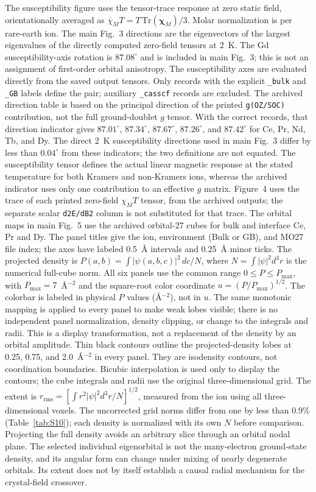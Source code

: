 \documentclass[11pt]{article}
\begin{document}
The susceptibility figure uses the tensor-trace response at zero static field, orientationally averaged as $\overline{\chi}_M T=T\,\mathrm{Tr}(\boldsymbol{\chi}_M)/3$. Molar normalization is per rare-earth ion. The main Fig.~3 directions are the eigenvectors of the largest eigenvalues of the directly computed zero-field tensors at 2~K. The Gd susceptibility-axis rotation is $87.08^\circ$ and is included in main Fig.~3; this is not an assignment of first-order orbital anisotropy. The susceptibility axes are evaluated directly from the saved output tensors. Only records with the explicit \texttt{\_bulk} and \texttt{\_GB} labels define the pair; auxiliary \texttt{\_casscf} records are excluded. The archived direction table is based on the principal direction of the printed \texttt{g(OZ/SOC)} contribution, not the full ground-doublet $g$ tensor. With the correct records, that direction indicator gives $87.01^\circ$, $87.34^\circ$, $87.67^\circ$, $87.26^\circ$, and $87.42^\circ$ for Ce, Pr, Nd, Tb, and Dy. The direct 2~K susceptibility directions used in main Fig.~3 differ by less than $0.04^\circ$ from these indicators; the two definitions are not equated. The susceptibility tensor defines the actual linear magnetic response at the stated temperature for both Kramers and non-Kramers ions, whereas the archived indicator uses only one contribution to an effective $g$ matrix. Figure~4 uses the trace of each printed zero-field $\chi_M T$ tensor, from the archived outputs; the separate scalar \texttt{d2E/dB2} column is not substituted for that trace. The orbital maps in main Fig.~5 use the archived orbital-27 cubes for bulk and interface Ce, Pr and Dy. The panel titles give the ion, environment (Bulk or GB), and MO27 file index; the axes have labeled 0.5~\AA{} intervals and 0.25~\AA{} minor ticks. The projected density is $P(a,b)=\int |\psi(a,b,c)|^2\,dc/N$, where $N=\int|\psi|^2d^3r$ is the numerical full-cube norm. All six panels use the common range $0\leq P\leq P_{\max}$, with $P_{\max}=7$~\AA$^{-2}$ and the square-root color coordinate $u=(P/P_{\max})^{1/2}$. The colorbar is labeled in physical $P$ values (\AA$^{-2}$), not in $u$. The same monotonic mapping is applied to every panel to make weak lobes visible; there is no independent panel normalization, density clipping, or change to the integrals and radii. This is a display transformation, not a replacement of the density by an orbital amplitude. Thin black contours outline the projected-density lobes at 0.25, 0.75, and 2.0~\AA$^{-2}$ in every panel. They are isodensity contours, not coordination boundaries. Bicubic interpolation is used only to display the contours; the cube integrals and radii use the original three-dimensional grid. The extent is $r_{\mathrm{rms}}=[\int r^2|\psi|^2d^3r/N]^{1/2}$, measured from the ion using all three-dimensional voxels. The uncorrected grid norms differ from one by less than 0.9\% (Table~\ref{tab:S10}); each density is normalized with its own $N$ before comparison. Projecting the full density avoids an arbitrary slice through an orbital nodal plane. The selected individual eigenorbital is not the many-electron ground-state density, and its angular form can change under mixing of nearly degenerate orbitals. Its extent does not by itself establish a causal radial mechanism for the crystal-field crossover.
\end{document}
